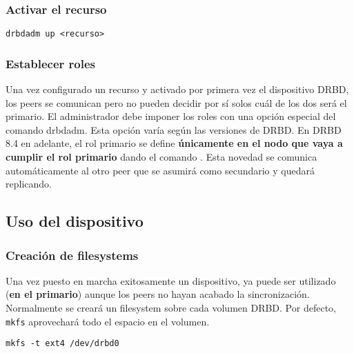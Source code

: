 \subsubsection{Activar el recurso}
\begin{lstlisting}
drbdadm up <recurso>
\end{lstlisting}

\subsubsection{Establecer roles}
Una vez configurado un recurso y activado por primera vez el dispositivo DRBD, los peers se comunican pero no pueden decidir por sí solos  cuál de los dos será el primario. El administrador debe imponer los roles con una opción especial del comando drbdadm. Esta opción varía según las versiones de DRBD. 
En DRBD 8.4 en adelante, el rol primario se define \textbf{únicamente en el nodo que vaya a cumplir el rol primario} dando el comando . Esta novedad se comunica automáticamente al otro peer que se asumirá como secundario y quedará replicando.



\subsection{Uso del dispositivo}

\subsubsection{Creación de filesystems}
Una vez puesto en marcha exitosamente un dispositivo, ya puede ser utilizado (\textbf{en el primario}) aunque los peers no hayan acabado la sincronización. Normalmente se creará un filesystem sobre cada volumen DRBD. Por defecto, \texttt{mkfs} aprovechará todo el espacio en el volumen. 

\begin{lstlisting}
mkfs -t ext4 /dev/drbd0
\end{lstlisting}


\\ 
 
